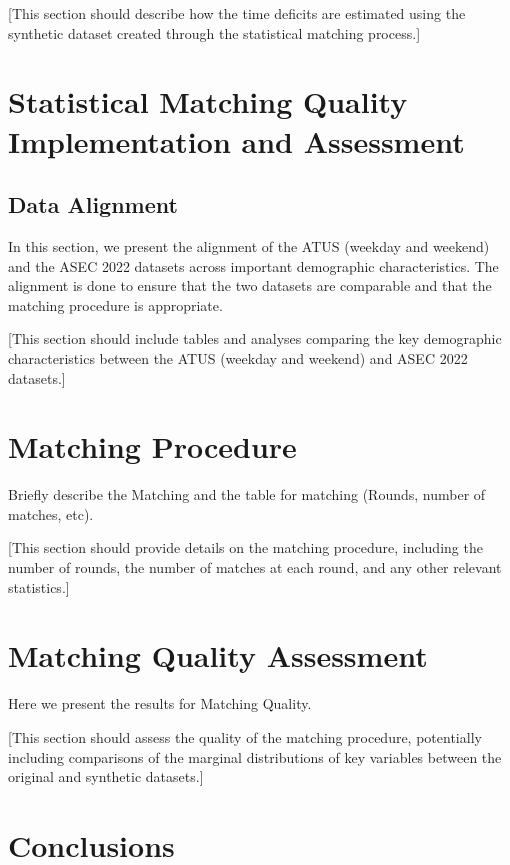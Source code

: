 \documentclass[
  11pt,
]{article}
\begin{document}
{[}This section should describe how the time deficits are estimated
using the synthetic dataset created through the statistical matching
process.{]}

\section{Statistical Matching Quality Implementation and
Assessment}\label{statistical-matching-quality-implementation-and-assessment}

\subsection{Data Alignment}\label{data-alignment}

In this section, we present the alignment of the ATUS (weekday and
weekend) and the ASEC 2022 datasets across important demographic
characteristics. The alignment is done to ensure that the two datasets
are comparable and that the matching procedure is appropriate.

{[}This section should include tables and analyses comparing the key
demographic characteristics between the ATUS (weekday and weekend) and
ASEC 2022 datasets.{]}

\section{Matching Procedure}\label{matching-procedure}

Briefly describe the Matching and the table for matching (Rounds, number
of matches, etc).

{[}This section should provide details on the matching procedure,
including the number of rounds, the number of matches at each round, and
any other relevant statistics.{]}

\section{Matching Quality Assessment}\label{matching-quality-assessment}

Here we present the results for Matching Quality.

{[}This section should assess the quality of the matching procedure,
potentially including comparisons of the marginal distributions of key
variables between the original and synthetic datasets.{]}

\section{Conclusions}\label{conclusions}
\end{document}
